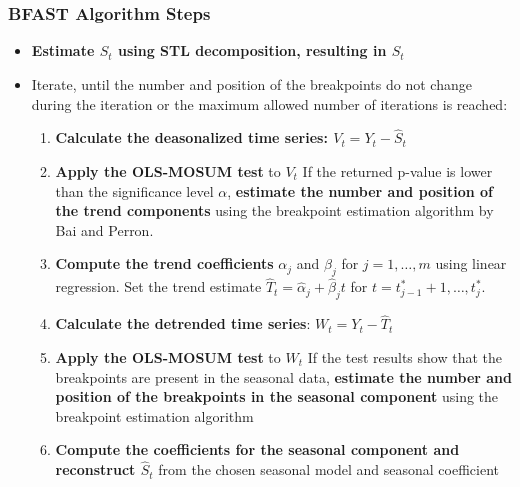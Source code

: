 \documentclass[presentation.tex]{subfiles}
\begin{document}
\begin{frame}
  \frametitle{BFAST Algorithm Steps}
  \begin{itemize}
  \item \textbf{Estimate $S_t$ using STL decomposition, resulting in $\hat{S}_t$}
  \item Iterate, until the number and position of the breakpoints do
    not change during the iteration or the maximum allowed number of iterations
    is reached:
    \begin{enumerate}
    \item \textbf{Calculate the deasonalized time series: $V_t = Y_t - \hat{S}_t$}
    \item \textbf{Apply the OLS-MOSUM test} to $V_t$
      If the returned p-value is lower than the significance level $\alpha$,
      \textbf{estimate the number and position of the trend components} using the
      breakpoint estimation algorithm by Bai and Perron.
    \item \textbf{Compute the trend coefficients} $\alpha_j$ and $\beta_j$ for
      $j = 1, \hdots, m$ using linear regression. Set the trend estimate
      $\hat{T}_t = \hat{\alpha}_j + \hat{\beta}_j t$ for
      $t = t^*_{j-1} + 1, \hdots, t^*_j$.
    \item \textbf{Calculate the detrended time series}: $W_t = Y_t - \hat{T}_t$
    \item \textbf{Apply the OLS-MOSUM test} to $W_t$
    If the test results show that the breakpoints are present in the
      seasonal data, \textbf{estimate the number and position of the
      breakpoints in the seasonal component} using the breakpoint estimation
      algorithm
    \item \textbf{Compute the coefficients for the seasonal component
      and reconstruct $\hat{S}_t$} from the chosen seasonal model and seasonal
      coefficient
  \end{enumerate}
\end{itemize}

\end{frame}
\end{document}
